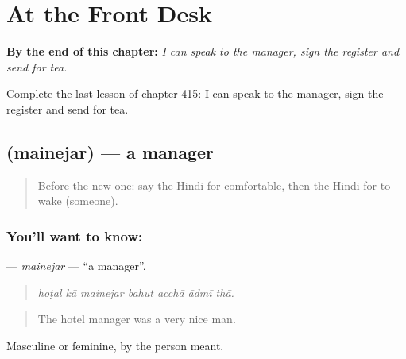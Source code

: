 
\chapter{At the Front Desk}
\label{ch:hi-at-the-front-desk}

\begin{chapteropening}
\textbf{By the end of this chapter:} \emph{I can speak to the manager, sign the register and send for tea.}

Complete the last lesson of chapter 415: I can speak to the manager, sign the register and send for tea.
\end{chapteropening}

\section[\texorpdfstring{\hi{मैनेजर} (mainejar)}{मैनेजर (mainejar)}]{ (mainejar) — a manager}

\label{lesson:HI-C415-mainejar}



\begin{quote}
Before the new one: say the Hindi for comfortable, then the Hindi for to wake (someone).
\end{quote}

\subsection*{You'll want to know: }
\textbf{} — \emph{mainejar} — \textquotedblleft{}a manager\textquotedblright{}.

\begin{quote}
      
\end{quote}

\begin{quote}
\emph{hoṭal kā mainejar bahut acchā ādmī thā.}
\end{quote}

\begin{quote}
The hotel manager was a very nice man.
\end{quote}

Masculine or feminine, by the person meant.

